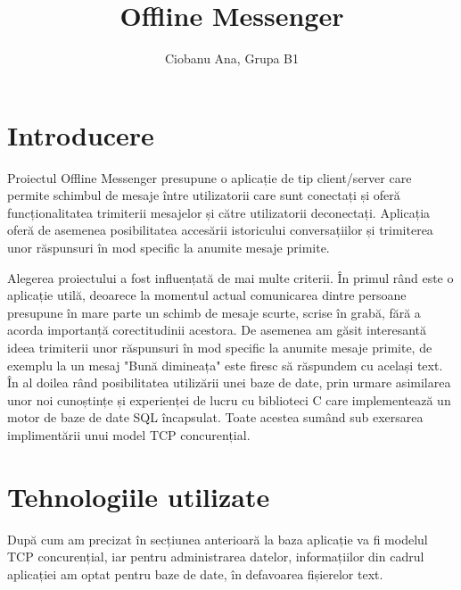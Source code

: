 \documentclass{article}
\begin{document}
\title{Offline Messenger}
\author{Ciobanu Ana, Grupa B1}
\date{}
\maketitle
\section{Introducere}
Proiectul Offline Messenger presupune o aplicație de tip client/server care permite schimbul de mesaje între utilizatorii care sunt conectați și oferă funcționalitatea trimiterii mesajelor și către utilizatorii deconectați. Aplicația oferă de asemenea posibilitatea accesării istoricului conversațiilor și trimiterea unor răspunsuri în mod specific la anumite mesaje primite.

Alegerea proiectului a fost influențată de mai multe criterii. În primul rând este o aplicație utilă, deoarece la momentul actual comunicarea dintre persoane presupune în mare parte un schimb de mesaje scurte, scrise în grabă, fără a acorda importanță corectitudinii acestora. De asemenea am găsit interesantă ideea trimiterii unor răspunsuri în mod specific la anumite mesaje primite, de exemplu la un mesaj "Bună dimineața" este firesc să răspundem cu același text. În al doilea rând posibilitatea utilizării unei baze de date, prin urmare asimilarea unor noi cunoștințe și experienței de lucru cu biblioteci C care implementează un motor de baze de date SQL încapsulat. Toate acestea sumând sub exersarea implimentării unui model TCP concurențial.
\section{Tehnologiile utilizate}
După cum am precizat în secțiunea anterioară la baza aplicație va fi modelul TCP concurențial, iar pentru administrarea datelor, informațiilor din cadrul aplicației am optat pentru baze de date, în defavoarea fișierelor text.
\end{document}
